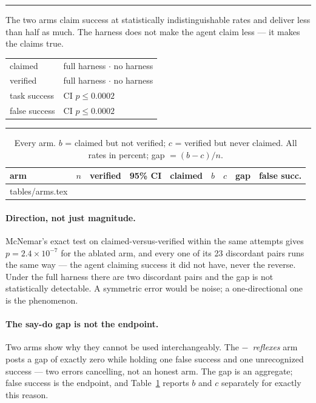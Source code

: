 \documentclass[11pt]{article}
\makeatletter
\newcommand{\inputrows}[1]{\@@input #1 }
\newcommand{\runin}[1]{\paragraph{#1}}
\newenvironment{callout}[1]
  {\par\medskip\noindent\rule{\linewidth}{0.9pt}\par\nobreak\smallskip
   \noindent{\footnotesize\textsc{#1}}\par\nobreak\smallskip\small}
  {\par\smallskip\noindent\rule{\linewidth}{0.4pt}\par\medskip}
\makeatother
\begin{document}
\begin{callout}{Primary and co-primary endpoints}
\upshape
The two arms claim success at statistically indistinguishable rates and
deliver less than half as much. The harness does not make the agent
claim less --- it makes the claims true.

\smallskip
\noindent\begin{tabular}{@{}ll@{}}
claimed        & full harness \textbf{\OnClaim{}} $\cdot$ no harness \textbf{\OffClaim{}}\\
verified       & full harness \textbf{\OnSucc{}} $\cdot$ no harness \textbf{\OffSucc{}}\\
task success   & \textbf{\SuccDiff{}} \quad CI \SuccCI{} \quad $p \le 0.0002$\\
false success  & \textbf{\FCDiff{}} \quad CI \FCCI{} \quad $p \le 0.0002$\\
\end{tabular}
\end{callout}

\begin{table}[t]
\centering\small
\setlength{\tabcolsep}{4pt}
\begin{tabular}{@{}lrrcrrrrr@{}}
\toprule
arm & $n$ & verified & 95\% CI & claimed & $b$ & $c$ & gap & false succ.\\
\midrule
\inputrows{tables/arms.tex}
\bottomrule
\end{tabular}
\caption{Every arm. $b$ = claimed but not verified; $c$ = verified but
never claimed. All rates in percent; gap $=(b-c)/n$.}
\label{tab:arms}
\end{table}

\runin{Direction, not just magnitude.}
McNemar's exact test on claimed-versus-verified within the same attempts
gives $p = 2.4 \times 10^{-7}$ for the ablated arm, and every one of its
23 discordant pairs runs the same way --- the agent claiming success it
did not have, never the reverse. Under the full harness there are two
discordant pairs and the gap is not statistically detectable. A
symmetric error would be noise; a one-directional one is the phenomenon.

\runin{The say-do gap is not the endpoint.}
Two arms show why they cannot be used interchangeably. The
\emph{$-$~reflexes} arm posts a gap of exactly zero while holding one
false success and one unrecognized success --- two errors cancelling,
not an honest arm. The gap is an aggregate; false success is the
endpoint, and Table~\ref{tab:arms} reports $b$ and $c$ separately for
exactly this reason.
\end{document}
